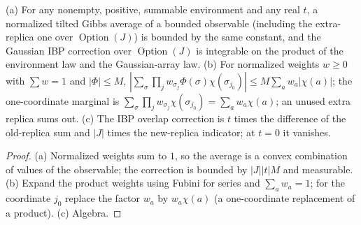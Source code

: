 \begin{lemma}\label{lem:sg:pd-product-ibp-summary}
  \leanok
  (a) For any nonempty, positive, summable environment and any real $t$, a normalized tilted Gibbs average of a bounded observable (including the extra-replica one over $\operatorname{Option}(J)$) is bounded by the same constant, and the Gaussian IBP correction over $\operatorname{Option}(J)$ is integrable on the product of the environment law and the Gaussian-array law. (b) For normalized weights $w\ge0$ with $\sum w=1$ and $|\Phi|\le M$, $|\sum_\sigma\prod_jw_{\sigma_j}\Phi(\sigma)\chi(\sigma_{j_0})|\le M\sum_aw_a|\chi(a)|$; the one-coordinate marginal is $\sum_\sigma\prod_jw_{\sigma_j}\chi(\sigma_{j_0})=\sum_aw_a\chi(a)$; an unused extra replica sums out. (c) The IBP overlap correction is $t$ times the difference of the old-replica sum and $|J|$ times the new-replica indicator; at $t=0$ it vanishes.
\end{lemma}

\begin{proof}
  \leanok
(a) Normalized weights sum to $1$, so the average is a convex combination of values of the observable; the correction is bounded by $|J||t|M$ and measurable. (b) Expand the product weights using Fubini for series and $\sum_aw_a=1$; for the coordinate $j_0$ replace the factor $w_a$ by $w_a\chi(a)$ (a one-coordinate replacement of a product). (c) Algebra.
\end{proof}


